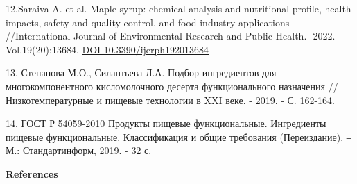 \begin{references}
12.Saraiva A. et al. Maple syrup: chemical analysis and nutritional
profile, health impacts, safety and quality control, and food industry
applications //International Journal of Environmental Research and
Public Health.- 2022.-Vol.19(20):13684.
\href{https://doi.org/10.3390/ijerph192013684}{DOI
10.3390/ijerph192013684}

13. Степанова М.О., Силантьева Л.А. Подбор ингредиентов для
многокомпонентного кисломолочного десерта функционального назначения
//Низкотемпературные и пищевые технологии в XXI веке. - 2019. - С.
162-164.

14. ГОСТ Р 54059-2010 Продукты пищевые функциональные. Ингредиенты
пищевые функциональные. Классификация и общие требования (Переиздание).
‒ М.: Стандартинформ, 2019. - 32 с.
\end{references}

\begin{center}
{\bfseries References}
\end{center}

